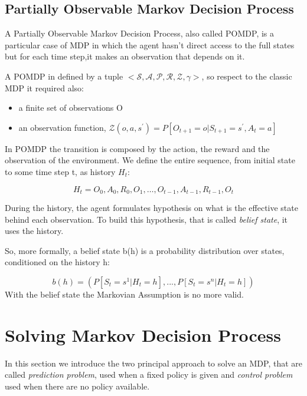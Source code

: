 \subsection{Partially Observable Markov Decision Process}
A Partially Observable Markov Decision Process, also called POMDP, is a particular case of MDP in which the agent hasn't direct access to the full states but for each time step,it makes an observation that depends on it. 

A POMDP in defined by a tuple $<\mathcal{S},\mathcal{A},\mathcal{P},\mathcal{R},\mathcal{Z},\gamma>$, so respect to the classic MDP it required also:
\begin{itemize}
  \item a finite set of observations O
  \item an observation function, $\mathcal{Z}(o,a,s^{'}) = P\left [O_{t+1} = o | S_{t+1} = s^{'}, A_t = a \right]$
  
\end{itemize}

In POMDP the transition is composed by the action, the reward and the observation of the environment. 
We define the entire sequence, from initial state to some time step t, as history $H_t$:

\begin{equation*}
    H_t = O_0, A_0, R_0, O_1, \dots, O_{t-1}, A_{t-1}, R_{t-1}, O_{t}
\end{equation*}

During the history, the agent formulates hypothesis on what is the effective state behind each observation. To build this hypothesis, that is called \textit{belief state}, it uses the history.

So, more formally, a belief state b(h) is a probability distribution over states, conditioned on the history h:

\begin{equation*}
b(h) = \left (P\left[ S_t = s^{1} | H_t = h \right] , ... , P\left[ S_t = s^{n} | H_t = h \right]\right) 
\end{equation*}
With the belief state the Markovian Assumption is no more valid.

\section{Solving Markov Decision Process}
In this section we introduce the two principal approach to solve an MDP, that are called \emph{prediction problem}, used when a fixed policy is given and \emph{control problem} used when there are no policy available. 

